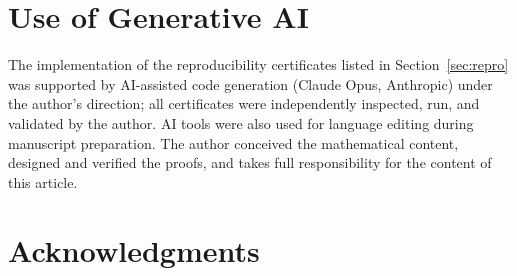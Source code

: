\documentclass{article}
\theoremstyle{plain}
\theoremstyle{definition}
\numberwithin{equation}{section}
\begin{document}
\section*{Use of Generative AI}

The implementation of the reproducibility certificates listed in
Section~\ref{sec:repro} was supported by AI-assisted code generation
(Claude Opus, Anthropic) under the author's direction; all certificates
were independently inspected, run, and validated by the author. AI tools
were also used for language editing during manuscript preparation. The
author conceived the mathematical content, designed and verified the
proofs, and takes full responsibility for the content of this article.

\section*{Acknowledgments}
\end{document}
